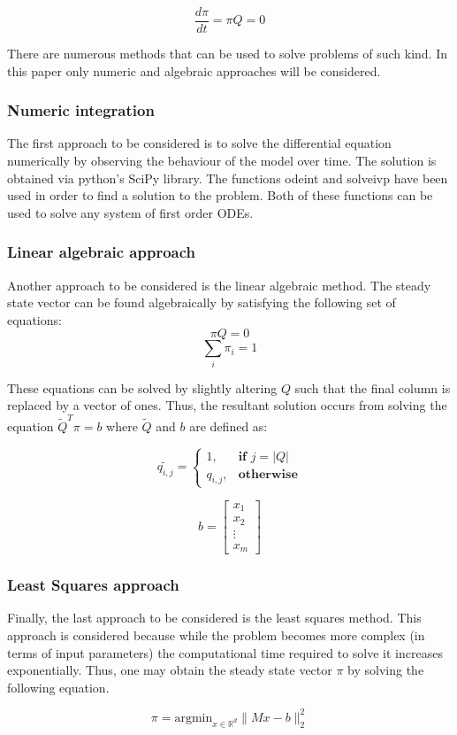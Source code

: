 \[
\frac{d\pi}{dt} = \pi Q = 0
\]

There are numerous methods that can be used to solve problems of such kind. 
In this paper only numeric and algebraic approaches will be considered. 

\subsubsection{Numeric integration}
The first approach to be considered is to solve the differential equation numerically 
by observing the behaviour of the model over time. 
The solution is obtained via python's SciPy library. 
The functions odeint and solve\textunderscore ivp have been used in order to find 
a solution to the problem. 
Both of these functions can be used to solve any system of first order ODEs.

\subsubsection{Linear algebraic approach}
Another approach to be considered is the linear algebraic method. 
The steady state vector can be found algebraically by satisfying the following set 
of equations:
\[ \pi Q = 0 \]
\[ \sum_{i} \pi_i = 1 \]

These equations can be solved by slightly altering \( Q \) such that the final column 
is replaced by a vector of ones. 
Thus, the resultant solution occurs from solving the equation \( \tilde{Q}^T \pi = b \) 
where \( \tilde{Q} \) and \( b \) are defined as:

\[
\tilde{q_{i, j}} = 
\begin{cases}
    1, & \textbf{if } j = |Q| \\
    q_{i,j}, & \textbf{otherwise}
\end{cases}
\]

\[
b = 
\begin{bmatrix}
    x_{1} \\
    x_{2} \\
    \vdots \\
    x_{m}
\end{bmatrix}
\]


\subsubsection{Least Squares approach}
Finally, the last approach to be considered is the least squares method. 
This approach is considered because while the problem becomes more complex (in terms 
of input parameters) the computational time required to solve it increases exponentially. 
Thus, one may obtain the steady state vector \( \pi \) by solving the following 
equation.

\[
\pi = \text{argmin}_{x\in\mathbb{R}^{d}}\|Mx-b\|_2^2
\]
